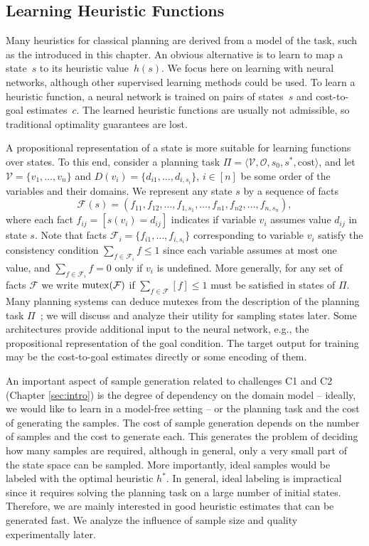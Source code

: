 \subsection{Learning Heuristic Functions}
\label{sec:background_learningheuristics}

Many heuristics for classical planning are derived from a model of the task, such as the \sas introduced in this chapter. An obvious alternative is to learn to map a state~$s$ to its heuristic value~$h(s)$. We focus here on learning with neural networks, although other supervised learning methods could be used. To learn a heuristic function, a neural network is trained on pairs of states~$s$ and cost-to-goal estimates~$c$. The learned heuristic functions are usually not admissible, so traditional optimality guarantees are lost.

A propositional representation of a state is more suitable for learning functions over states. To this end, consider a planning task $\Pi=\langle\mathcal{V},\mathcal{O},s_0,s^*, \text{cost}\rangle$, and let $\mathcal{V}=\{v_1,\ldots,v_n\}$ and $D(v_i)=\{d_{i1},\ldots,d_{i,s_i}\}$, $i\in[n]$ be some order of the variables and their domains. We represent any state $s$ by a sequence of facts $$\mathcal{F}(s)=(f_{11},f_{12},\ldots,f_{1,s_1},\ldots,f_{n1},f_{n2},\ldots,f_{n,s_n}),$$ where each fact $f_{ij}=[s(v_i)=d_{ij}]$ indicates if variable $v_i$ assumes value $d_{ij}$ in state $s$. Note that facts $\mathcal{F}_i=\{f_{i1},\ldots,f_{i,s_i}\}$ corresponding to variable $v_i$ satisfy the consistency condition $\sum_{f\in \mathcal{F}_i} f\leq 1$ since each variable assumes at most one value, and $\sum_{f\in \mathcal{F}_i} f=0$ only if $v_i$ is undefined. More generally, for any set of facts $\mathcal{F}$ we write $\operatorname{mutex}(\mathcal{F})$ if $\sum_{f\in \mathcal{F}} [f]\leq 1$ must be satisfied in states of $\Pi$. Many planning systems can deduce mutexes from the description of the planning task $\Pi$~\cite{Helmert/2009}; we will discuss and analyze their utility for sampling states later. Some architectures provide additional input to the neural network, e.g., the propositional representation of the goal condition. The target output for training may be the cost-to-goal estimates directly or some encoding of them.

An important aspect of sample generation related to challenges C1 and C2 (Chapter \ref{sec:intro}) is the degree of dependency on the domain model -- ideally, we would like to learn in a model-free setting -- or the planning task and the cost of generating the samples. The cost of sample generation depends on the number of samples and the cost to generate each. This generates the problem of deciding how many samples are required, although in general, only a very small part of the state space can be sampled. More importantly, ideal samples would be labeled with the optimal heuristic $h^*$. In general, ideal labeling is impractical since it requires solving the planning task on a large number of initial states. Therefore, we are mainly interested in good heuristic estimates that can be generated fast. We analyze the influence of sample size and quality experimentally later.

